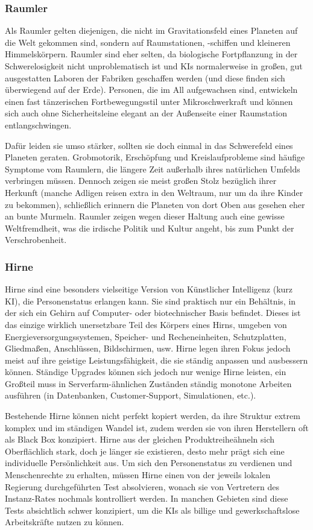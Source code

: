 \subsubsection{Raumler}
Als Raumler gelten diejenigen, die nicht im Gravitationsfeld eines Planeten auf die Welt gekommen sind, sondern auf Raumstationen, -schiffen und kleineren Himmelskörpern. Raumler sind eher selten, da biologische Fortpflanzung in der Schwerelosigkeit nicht unproblematisch ist und KIs normalerweise in großen, gut ausgestatten Laboren der Fabriken geschaffen werden (und diese finden sich überwiegend auf der Erde). Personen, die im All aufgewachsen sind, entwickeln einen fast tänzerischen Fortbewegungsstil unter Mikroschwerkraft und können sich auch ohne Sicherheitsleine elegant an der Außenseite einer Raumstation entlangschwingen.

Dafür leiden sie umso stärker, sollten sie doch einmal in das Schwerefeld eines Planeten geraten. Grobmotorik, Erschöpfung und Kreislaufprobleme sind häufige Symptome vom Raumlern, die längere Zeit außerhalb ihres \glqq natürlichen\grqq{}  Umfelds verbringen müssen. Dennoch zeigen sie meist großen Stolz bezüglich ihrer Herkunft (manche Adligen reisen extra in den Weltraum, nur um da ihre Kinder zu bekommen), schließlich erinnern die Planeten \glqq von dort Oben aus gesehen\grqq{} eher an bunte Murmeln. Raumler zeigen wegen dieser Haltung auch eine gewisse Weltfremdheit, was die irdische Politik und Kultur angeht, bis zum Punkt der Verschrobenheit.
\subsubsection{Hirne}
Hirne sind eine besonders vielseitige Version von Künstlicher Intelligenz (kurz KI), die Personenstatus erlangen kann. Sie sind praktisch nur ein Behältnis, in der sich ein Gehirn auf Computer- oder biotechnischer Basis befindet. Dieses ist das einzige wirklich unersetzbare Teil des \glqq Körpers\grqq{} eines Hirns, umgeben von  Energieversorgungssystemen, Speicher- und Recheneinheiten, Schutzplatten, Gliedmaßen, Anschlüssen, Bildschirmen, usw. Hirne legen ihren Fokus jedoch meist auf ihre \glqq geistige\grqq{} Leistungsfähigkeit, die sie ständig anpassen und ausbessern können. Ständige Upgrades können sich jedoch nur wenige Hirne leisten, ein Großteil muss in Serverfarm-ähnlichen Zuständen ständig monotone Arbeiten ausführen (in Datenbanken, Customer-Support, Simulationen, etc.).

Bestehende Hirne können nicht perfekt kopiert werden, da ihre Struktur extrem komplex und im ständigen Wandel ist, zudem werden sie von ihren Herstellern oft als Black Box konzipiert. Hirne aus der gleichen \glqq Produktreihe\grqq{}ähneln sich Oberflächlich stark, doch je länger sie existieren, desto mehr prägt sich eine individuelle Persönlichkeit aus. Um sich den Personenstatus zu verdienen und Menschenrechte zu erhalten, müssen Hirne einen von der jeweils lokalen Regierung durchgeführten Test absolvieren, wonach sie von Vertretern des Instanz-Rates nochmals kontrolliert werden. In manchen Gebieten sind diese Tests absichtlich schwer konzipiert, um die KIs als billige und gewerkschaftslose Arbeitskräfte nutzen zu können.
